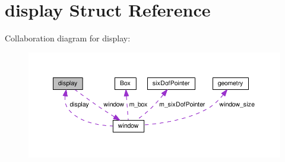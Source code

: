 \hypertarget{structdisplay}{\section{display Struct Reference}
\label{structdisplay}
}


Collaboration diagram for display\-:
\nopagebreak
\begin{figure}[H]
\begin{center}
\leavevmode
\includegraphics[width=350pt]{structdisplay__coll__graph}
\end{center}
\end{figure}
